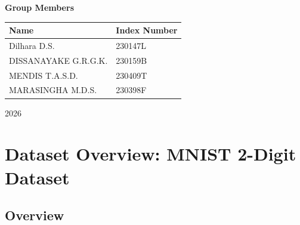 \documentclass[12pt,a4paper]{report}
\begin{document}
\begin{titlepage}
{\Large\bfseries
Group Members
\par}

\vspace{0.4cm}

\begin{center}
\renewcommand{\arraystretch}{1.3}

\begin{tabular}{|p{8cm}|p{4cm}|}
\hline
\textbf{Name} & \textbf{Index Number} \\
\hline
Dilhara D.S. & 230147L \\
\hline
 DISSANAYAKE G.R.G.K.  & 230159B \\
\hline
MENDIS T.A.S.D.  & 230409T \\
\hline
 MARASINGHA M.D.S.  & 230398F \\
\hline

\end{tabular}

\end{center}

\vfill

{\large
2026
\par}

\end{titlepage}



\tableofcontents

\clearpage




\chapter{Dataset Overview: MNIST 2-Digit Dataset}

\section{Overview}
\end{document}
